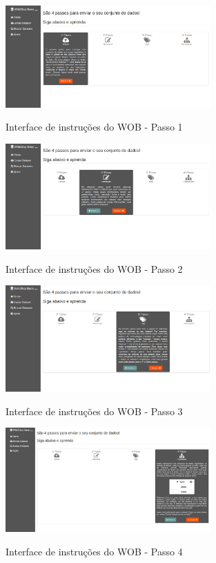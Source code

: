 \begin{figure}[!htb]
    \centering
    \caption{Interface de instruções do WOB - Passo 1}
    \includegraphics[width=0.7\textwidth]{./04-figuras/wob-ajuda}
    \label{fig:wob-ajuda}
\end{figure}

\begin{figure}[!htb]
    \centering
    \caption{Interface de instruções do WOB - Passo 2}
    \includegraphics[width=0.7\textwidth]{./04-figuras/wob-ajuda2}
    \label{fig:wob-ajuda2}
\end{figure}

\begin{figure}[!htb]
    \centering
    \caption{Interface de instruções do WOB - Passo 3}
    \includegraphics[width=0.7\textwidth]{./04-figuras/wob-ajuda3}
    \label{fig:wob-ajuda3}
\end{figure}

\begin{figure}[!htb]
    \centering
    \caption{Interface de instruções do WOB - Passo 4}
    \includegraphics[width=0.7\textwidth]{./04-figuras/wob-ajuda4}
    \label{fig:wob-ajuda4}
\end{figure}

